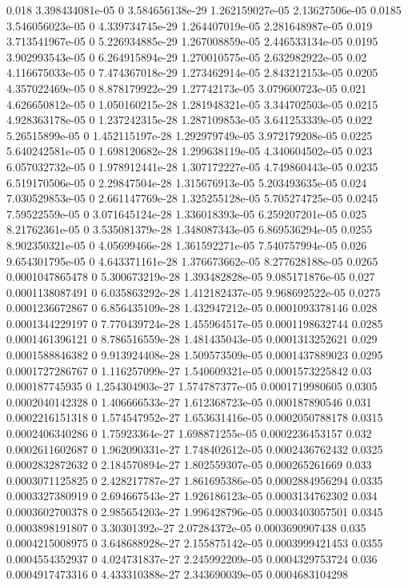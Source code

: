 {0.018 3.398434081e-05 0 3.584656138e-29 1.262159027e-05 2.13627506e-05
0.0185 3.546056023e-05 0 4.339734745e-29 1.264407019e-05 2.281648987e-05
0.019 3.713541967e-05 0 5.226934885e-29 1.267008859e-05 2.446533134e-05
0.0195 3.902993543e-05 0 6.264915894e-29 1.270010575e-05 2.632982922e-05
0.02 4.116675033e-05 0 7.474367018e-29 1.273462914e-05 2.843212153e-05
0.0205 4.357022469e-05 0 8.878179922e-29 1.27742173e-05 3.079600723e-05
0.021 4.626650812e-05 0 1.050160215e-28 1.281948321e-05 3.344702503e-05
0.0215 4.928363178e-05 0 1.237242315e-28 1.287109853e-05 3.641253339e-05
0.022 5.26515899e-05 0 1.452115197e-28 1.292979749e-05 3.972179208e-05
0.0225 5.640242581e-05 0 1.698120682e-28 1.299638119e-05 4.340604502e-05
0.023 6.057032732e-05 0 1.978912441e-28 1.307172227e-05 4.749860443e-05
0.0235 6.519170506e-05 0 2.29847504e-28 1.315676913e-05 5.203493635e-05
0.024 7.030529853e-05 0 2.661147769e-28 1.325255128e-05 5.705274725e-05
0.0245 7.59522559e-05 0 3.071645124e-28 1.336018393e-05 6.259207201e-05
0.025 8.21762361e-05 0 3.535081379e-28 1.348087343e-05 6.869536294e-05
0.0255 8.902350321e-05 0 4.05699466e-28 1.361592271e-05 7.540757994e-05
0.026 9.654301795e-05 0 4.643371161e-28 1.376673662e-05 8.277628188e-05
0.0265 0.0001047865478 0 5.300673219e-28 1.393482828e-05 9.085171876e-05
0.027 0.0001138087491 0 6.035863292e-28 1.412182437e-05 9.968692522e-05
0.0275 0.0001236672867 0 6.856435109e-28 1.432947212e-05 0.0001093378146
0.028 0.0001344229197 0 7.770439724e-28 1.455964517e-05 0.0001198632744
0.0285 0.0001461396121 0 8.786516559e-28 1.481435043e-05 0.0001313252621
0.029 0.0001588846382 0 9.913924408e-28 1.509573509e-05 0.0001437889023
0.0295 0.0001727286767 0 1.116257099e-27 1.540609321e-05 0.0001573225842
0.03 0.000187745935 0 1.254304903e-27 1.574787377e-05 0.0001719980605
0.0305 0.0002040142328 0 1.406666533e-27 1.612368723e-05 0.000187890546
0.031 0.0002216151318 0 1.574547952e-27 1.653631416e-05 0.0002050788178
0.0315 0.0002406340286 0 1.75923364e-27 1.698871255e-05 0.0002236453157
0.032 0.0002611602687 0 1.962090331e-27 1.748402612e-05 0.0002436762432
0.0325 0.0002832872632 0 2.184570894e-27 1.802559307e-05 0.000265261669
0.033 0.0003071125825 0 2.428217787e-27 1.861695386e-05 0.0002884956294
0.0335 0.0003327380919 0 2.694667543e-27 1.926186123e-05 0.0003134762302
0.034 0.0003602700378 0 2.985654203e-27 1.996428796e-05 0.0003403057501
0.0345 0.0003898191807 0 3.30301392e-27 2.07284372e-05 0.0003690907438
0.035 0.0004215008975 0 3.648688928e-27 2.155875142e-05 0.0003999421453
0.0355 0.0004554352937 0 4.024731837e-27 2.245992209e-05 0.0004329753724
0.036 0.0004917473316 0 4.433310388e-27 2.343690039e-05 0.0004683104298
}

